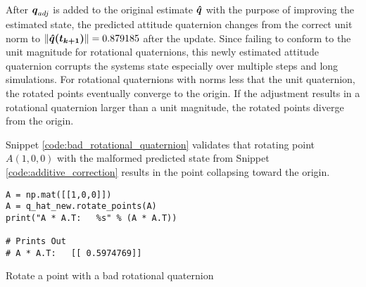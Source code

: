After $\boldsymbol{q}_{adj}$ is added to the original estimate $\boldsymbol{\hat{q}}$ with the purpose of improving the estimated state, the predicted attitude quaternion changes from the correct unit norm to $ \| \boldsymbol{\hat{q}(t_{k+1})} \| = 0.879185$ after the update.  Since failing to conform to the unit magnitude for rotational quaternions, this newly estimated attitude quaternion corrupts the systems state especially over multiple steps and long simulations.  For rotational quaternions with norms less that the unit quaternion, the rotated points eventually converge to the origin.  If the adjustment results in a rotational quaternion larger than a unit magnitude, the rotated points diverge from the origin.

Snippet \ref{code:bad_rotational_quaternion} validates that rotating point $A (1,0,0)$ with the malformed predicted state from Snippet \ref{code:additive_correction} results in the point collapsing toward the origin.
\begin{listing}
\begin{singlespace}
  \begin{verbatim}
A = np.mat([[1,0,0]])
A = q_hat_new.rotate_points(A)
print("A * A.T:   %s" % (A * A.T))

# Prints Out
# A * A.T:   [[ 0.5974769]]
  \end{verbatim}
\caption{Rotate a point with a bad rotational quaternion}
\label{code:bad_rotational_quaternion}
\nocite{minted}
\end{singlespace}
\end{listing}

